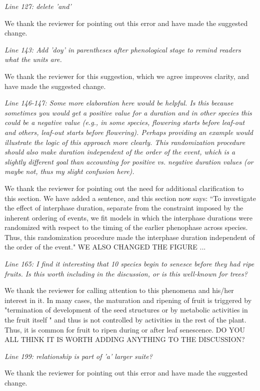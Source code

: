 \documentclass[10.95pt,a4paper]{letter}
\begin{document}
\par \emph{Line 127: delete 'and'}
\par We thank the reviewer for pointing out this error and have made the suggested change. 

\par \emph{Line 143: Add 'doy' in parentheses after phenological stage to remind readers what the units are.} 
\par We thank the reviewer for this suggestion, which we agree improves clarity, and have made the suggested change. 

\par \emph{Line 146-147: Some more elaboration here would be helpful.  Is this because sometimes you would get a positive value for a duration and in other species this could be a negative value (e.g., in some species, flowering starts before leaf-out and others, leaf-out starts before flowering).  Perhaps providing an example would illustrate the logic of this approach more clearly.  This randomization procedure should also make duration independent of the order of the event, which is a slightly different goal than accounting for positive vs. negative duration values (or maybe not, thus my slight confusion here).}
\par We thank the reviewer for pointing out the need for additional clarification to this section. We have added a sentence, and this section now says:
``To investigate the effect of interphase duration, separate from the constraint imposed by the inherent ordering of events, we fit models in which the interphase durations were randomized with respect to the timing of the earlier phenophase across species. Thus, this randomization procedure made the interphase duration independent of the order of the event." WE ALSO CHANGED THE FIGURE ...
\par \emph{Line 165: I find it interesting that 10 species begin to senesce before they had ripe fruits. Is this worth including in the discussion, or is this well-known for trees?} 
\par We thank the reviewer for calling attention to this phenomena and his/her interest in it. In many cases, the maturation and ripening of fruit is triggered by "termination of development of the seed structures or by metabolic activities in the fruit itself " and thus is not controlled by activities in the rest of the plant. Thus, it is common for fruit to ripen during or after leaf senescence. DO YOU ALL THINK IT  IS WORTH ADDING ANYTHING TO THE DISCUSSION?
\par \emph{Line 199: relationship is part of 'a' larger suite?}
\par We thank the reviewer for pointing out this error and have made the suggested change. 
\end{document}
